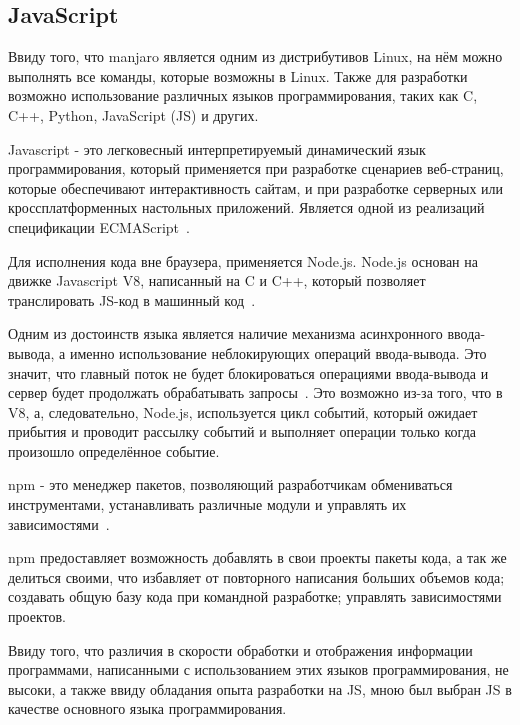 \subsection{JavaScript}

Ввиду того, что manjaro является одним из дистрибутивов Linux, на нём можно выполнять все команды, которые возможны в Linux. Также для разработки возможно использование различных языков программирования, таких как C, C++, Python, JavaScript (JS) и других. 

Javascript - это легковесный интерпретируемый динамический язык программирования, который применяется при разработке сценариев веб-страниц, которые обеспечивают интерактивность сайтам, и при разработке серверных или кроссплатформенных настольных приложений. Является одной из реализаций спецификации ECMAScript~\cite{JS}.

Для исполнения кода вне браузера, применяется Node.js. Node.js основан на движке Javascript V8, написанный на C и C++, который позволяет транслировать JS-код в машинный код~\cite{node}.

Одним из достоинств языка является наличие механизма асинхронного ввода-вывода, а именно использование неблокирующих операций ввода-вывода. Это значит, что главный поток не будет блокироваться операциями ввода-вывода и сервер будет продолжать обрабатывать запросы~\cite{node}. Это возможно из-за того, что в V8, а, следовательно, Node.js, используется цикл событий, который ожидает прибытия и проводит рассылку событий и выполняет операции только когда произошло определённое событие.

npm - это менеджер пакетов, позволяющий разработчикам обмениваться инструментами, устанавливать различные модули и управлять их зависимостями~\cite{npm}.

npm предоставляет возможность добавлять в свои проекты пакеты кода, а так же делиться своими, что избавляет от повторного написания больших объемов кода; создавать общую базу кода при командной разработке; управлять зависимостями проектов.

Ввиду того, что различия в скорости обработки и отображения информации программами, написанными с использованием этих языков программирования, не высоки, а также ввиду обладания опыта разработки на JS, мною был выбран JS в качестве основного языка программирования.